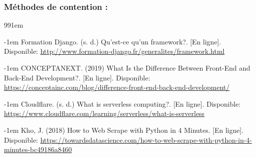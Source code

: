 \documentclass[12pt]{article}
\begin{document}
\subsubsection*{Méthodes de contention :}

\newpage 

\def\bibindent{1em}
\begin{thebibliography}{99\kern\bibindent}
\makeatletter
\let\old@biblabel\@biblabel
\def\@biblabel#1{\old@biblabel{#1}\kern\bibindent}
\let\old@bibitem\bibitem
\def\bibitem#1{\old@bibitem{#1}\leavevmode\kern-\bibindent}
\makeatother

    
    Formation Django. (s. d.) Qu'est-ce qu'un framework?. [En ligne].
    Disponible: \url{http://www.formation-django.fr/generalites/framework.html}

    CONCEPTANEXT. (2019) What Is the Difference Between Front-End and Back-End Development?. [En ligne].
    Disponible: \url{https://conceptainc.com/blog/difference-front-end-back-end-development/}
    
    Cloudflare. (s. d.) What is serverless computing?. [En ligne]. Disponible:
    \url{https://www.cloudflare.com/learning/serverless/what-is-serverless}

    Kho, J. (2018) How to Web Scrape with Python in 4 Minutes. [En ligne]. Disponible:
    \url{https://towardsdatascience.com/how-to-web-scrape-with-python-in-4-minutes-bc49186a8460}

    

\end{thebibliography}
\end{document}
